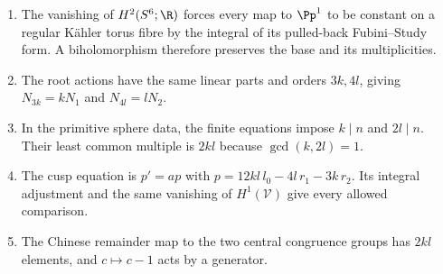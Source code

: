 \RungOne
\begin{enumerate}[label=\arabic*.]
\item The vanishing of $H^2(S^6;\R)$ forces every map to
$\Pp^1$ to be constant on a regular K\"ahler torus fibre by the
integral of its pulled-back Fubini--Study form. A biholomorphism
therefore preserves the base and its multiplicities.
\item The root actions have the same linear parts and orders
$3k,4l$, giving $N_{3k}=kN_1$ and $N_{4l}=lN_2$.
\item In the primitive sphere data, the finite equations impose
$k\mid n$ and $2l\mid n$. Their least common multiple is $2kl$
because $\gcd(k,2l)=1$.
\item The cusp equation is $p'=ap$ with
$p=12kl\,l_0-4l\,r_1-3k\,r_2$. Its integral adjustment and the
same vanishing of $H^1(\mathcal V)$ give every allowed comparison.
\item The Chinese remainder map to the two central congruence
groups has $2kl$ elements, and $c\mapsto c-1$ acts by a generator.
\end{enumerate}

